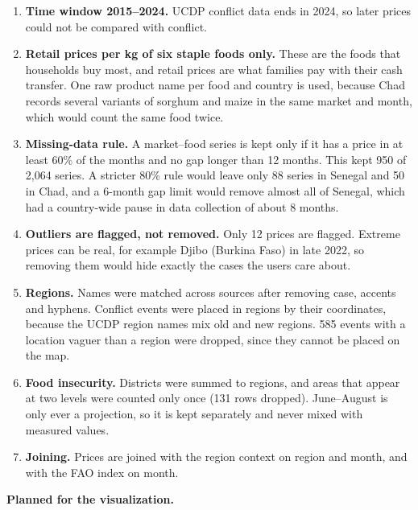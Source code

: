 \documentclass{article}
\begin{document}
\begin{enumerate}
  \item \textbf{Time window 2015--2024.} UCDP conflict data ends in 2024, so later prices could not be compared with conflict.
  \item \textbf{Retail prices per kg of six staple foods only.} These are the foods that households buy most, and retail prices are what families pay with their cash transfer. One raw product name per food and country is used, because Chad records several variants of sorghum and maize in the same market and month, which would count the same food twice.
  \item \textbf{Missing-data rule.} A market--food series is kept only if it has a price in at least 60\% of the months and no gap longer than 12 months. This kept 950 of 2,064 series. A stricter 80\% rule would leave only 88 series in Senegal and 50 in Chad, and a 6-month gap limit would remove almost all of Senegal, which had a country-wide pause in data collection of about 8 months.
  \item \textbf{Outliers are flagged, not removed.} Only 12 prices are flagged. Extreme prices can be real, for example Djibo (Burkina Faso) in late 2022, so removing them would hide exactly the cases the users care about.
  \item \textbf{Regions.} Names were matched across sources after removing case, accents and hyphens. Conflict events were placed in regions by their coordinates, because the UCDP region names mix old and new regions. 585 events with a location vaguer than a region were dropped, since they cannot be placed on the map.
  \item \textbf{Food insecurity.} Districts were summed to regions, and areas that appear at two levels were counted only once (131 rows dropped). June--August is only ever a projection, so it is kept separately and never mixed with measured values.
  \item \textbf{Joining.} Prices are joined with the region context on region and month, and with the FAO index on month.
\end{enumerate}

\textbf{Planned for the visualization.}
\end{document}
